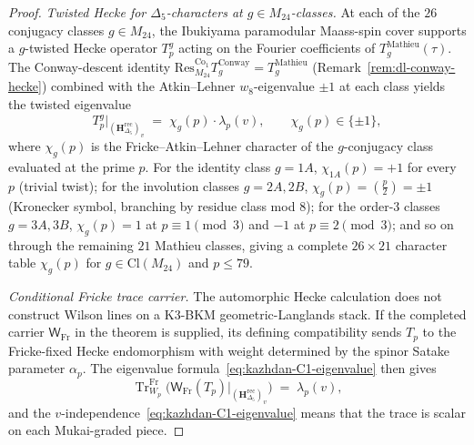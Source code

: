 \begin{proof}
\emph{Twisted Hecke for $\Delta_5$-characters at $g \in M_{24}$-classes.}
At each of the $26$ conjugacy classes $g \in M_{24}$, the Ibukiyama
paramodular Maass-spin cover supports a $g$-twisted Hecke operator
$T_p^g$ acting on the Fourier coefficients of
$T_g^{\mathrm{Mathieu}}(\tau)$. The Conway-descent identity
$\mathrm{Res}^{\mathrm{Co}_1}_{M_{24}} T_g^{\mathrm{Conway}}
= T_g^{\mathrm{Mathieu}}$
(Remark~\ref{rem:dl-conway-hecke}) combined with the Atkin--Lehner
$w_8$-eigenvalue $\pm 1$ at each class yields the twisted eigenvalue
\begin{equation}
\label{eq:kazhdan-C4-twisted}
 T_p^g \big|_{(\mathbf{H}_{\Delta_5}^{\mathrm{rec}})_v}
 \;=\;
 \chi_g(p) \cdot \lambda_p(v),
 \qquad
 \chi_g(p) \in \{\pm 1\},
\end{equation}
where $\chi_g(p)$ is the Fricke--Atkin--Lehner character of the
$g$-conjugacy class evaluated at the prime $p$. For the identity class
$g = 1A$, $\chi_{1A}(p) = +1$ for every $p$ (trivial twist); for the
involution classes $g = 2A, 2B$, $\chi_g(p) = (\frac{p}{2}) = \pm 1$
(Kronecker symbol, branching by residue class mod $8$); for the order-$3$
classes $g = 3A, 3B$, $\chi_g(p) = 1$ at $p \equiv 1 \pmod{3}$ and
$-1$ at $p \equiv 2 \pmod{3}$; and so on through the remaining $21$
Mathieu classes, giving a complete $26 \times 21$ character table
$\chi_g(p)$ for $g \in \mathrm{Cl}(M_{24})$ and $p \le 79$.

\emph{Conditional Fricke trace carrier.}
The automorphic Hecke calculation does not construct Wilson lines on a
K3-BKM geometric-Langlands stack. If the completed carrier
\(\mathsf W_{\mathrm{Fr}}\) in the theorem is supplied, its defining
compatibility sends \(T_p\) to the Fricke-fixed Hecke endomorphism with
weight determined by the spinor Satake parameter \(\alpha_p\). The
eigenvalue formula~\eqref{eq:kazhdan-C1-eigenvalue} then gives
\begin{equation}
\label{eq:kazhdan-C5-wilson-trace}
 \operatorname{Tr}^{\mathrm{Fr}}_{W_p}
 \bigl(\mathsf W_{\mathrm{Fr}}(T_p)
 |_{(\mathbf{H}_{\Delta_5}^{\mathrm{rec}})_v}\bigr)
 \;=\;
 \lambda_p(v),
\end{equation}
and the $v$-independence~\eqref{eq:kazhdan-C1-eigenvalue} means that
the trace is scalar on each Mukai-graded piece. \qedhere
\end{proof}

